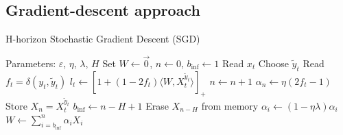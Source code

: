 \documentclass[preprint,12pt,authoryear]{elsarticle}
\begin{document}


\subsection{Gradient-descent approach}


\begin{algorithm}[t!]
	\caption{H-horizon Stochastic Gradient Descent (SGD)}\label{algo:HGD}
	\begin{algorithmic}
		
		\STATE Parameters:  $\varepsilon$, $\eta$, $\lambda$, $H$
		\STATE Set $W \leftarrow \vec{0}$, $n \leftarrow 0$, $b_\text{inf}\leftarrow 1$
		\STATE Read $x_t$
		\STATE Choose $\tilde{y}_t$		\STATE Read $f_t = \delta(y_t,\tilde{y}_t)$
		\STATE $l_t \leftarrow \left[ 1+(1-2f_t)\langle W,X_t^{\tilde{y}_t}\rangle\right]_{+}$ 
		\STATE $n \leftarrow n + 1$
		\STATE $\alpha_{n} \leftarrow \eta (2 f_t-1)$
		\STATE Store $X_{n} = X_t^{\tilde{y}_t}$
		\STATE $b_\text{inf} \leftarrow n - H + 1$
		\STATE Erase $X_{n - H }$ from memory
		\ENDIF 
		\STATE $\alpha_i \leftarrow (1 - \eta\lambda) \alpha_i$
		\ENDFOR			
		\STATE $W \leftarrow \sum_{i=b_\text{inf}}^n \alpha_i X_{i}$
		\ENDIF
		\ENDFOR
	\end{algorithmic}
\end{algorithm}
\end{document}
